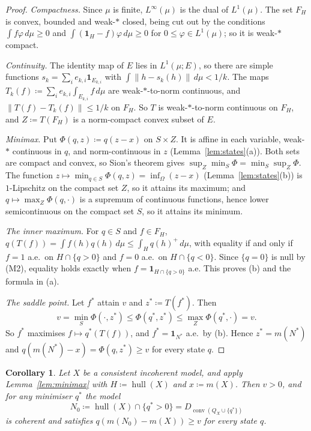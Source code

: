 \documentclass[11pt]{article}
\newcommand{\one}{\mathbf{1}}
\newcommand{\hull}{\operatorname{hull}}
\DeclareMathOperator{\conv}{conv}
\theoremstyle{plain}
\newtheorem{corollary}[theorem]{Corollary}
\theoremstyle{definition}
\theoremstyle{remark}
\begin{document}
\begin{proof}
\emph{Compactness.} Since $\mu$ is finite, $L^\infty(\mu)$ is the dual of $L^1(\mu)$. The set
$F_H$ is convex, bounded and weak-$\ast$ closed, being cut out by the conditions $\int f\varphi
\,d\mu\ge0$ and $\int(\one_H-f)\varphi\,d\mu\ge0$ for $0\le\varphi\in L^1(\mu)$; so it is
weak-$\ast$ compact.

\emph{Continuity.} The identity map of $E$ lies in $L^1(\mu;E)$, so there are simple functions
$s_k=\sum_ie_{k,i}\one_{E_{k,i}}$ with $\int\|h-s_k(h)\|\,d\mu<1/k$. The maps $T_k(f)\coloneqq
\sum_ie_{k,i}\int_{E_{k,i}}f\,d\mu$ are weak-$\ast$-to-norm continuous, and $\|T(f)-T_k(f)\|
\le1/k$ on $F_H$. So $T$ is weak-$\ast$-to-norm continuous on $F_H$, and $Z\coloneqq T(F_H)$ is
a norm-compact convex subset of $E$.

\emph{Minimax.} Put $\Phi(q,z)\coloneqq q(z-x)$ on $S\times Z$. It is affine in each variable,
weak-$\ast$ continuous in $q$, and norm-continuous in $z$ (Lemma~\ref{lem:states}(a)). Both sets
are compact and convex, so Sion's theorem \cite{Sion} gives $\sup_Z\min_S\Phi=\min_S\sup_Z
\Phi$. The function $z\mapsto\min_{q\in S}\Phi(q,z)=\inf_\Omega(z-x)$ (Lemma~\ref{lem:states}(b))
is $1$-Lipschitz on the compact set $Z$, so it attains its maximum; and $q\mapsto\max_Z\Phi(q,
\cdot)$ is a supremum of continuous functions, hence lower semicontinuous on the compact set
$S$, so it attains its minimum.

\emph{The inner maximum.} For $q\in S$ and $f\in F_H$, $q(T(f))=\int f(h)q(h)\,d\mu\le\int_H
q(h)^+\,d\mu$, with equality if and only if $f=1$ a.e.\ on $H\cap\{q>0\}$ and $f=0$ a.e.\ on
$H\cap\{q<0\}$. Since $\{q=0\}$ is null by (M2), equality holds exactly when $f=\one_{H\cap
\{q>0\}}$ a.e. This proves (b) and the formula in (a).

\emph{The saddle point.} Let $f^\ast$ attain $v$ and $z^\ast\coloneqq T(f^\ast)$. Then
\[
  v=\min_S\Phi(\cdot,z^\ast)\le\Phi(q^\ast,z^\ast)\le\max_Z\Phi(q^\ast,\cdot)=v .
\]
So $f^\ast$ maximises $f\mapsto q^\ast(T(f))$, and $f^\ast=\one_{N^\ast}$ a.e.\ by (b). Hence
$z^\ast=m(N^\ast)$ and $q(m(N^\ast)-x)=\Phi(q,z^\ast)\ge v$ for every state $q$.
\end{proof}

\begin{corollary}\label{cor:consistent}
Let $X$ be a consistent incoherent model, and apply Lemma~\ref{lem:minimax} with $H\coloneqq
\hull(X)$ and $x\coloneqq m(X)$. Then $v>0$, and for any minimiser $q^\ast$ the model
\[
  N_0\coloneqq\hull(X)\cap\{q^\ast>0\}=D_{\conv(Q_X\cup\{q^\ast\})}
\]
is coherent and satisfies $q(m(N_0)-m(X))\ge v$ for every state $q$.
\end{corollary}
\end{document}
